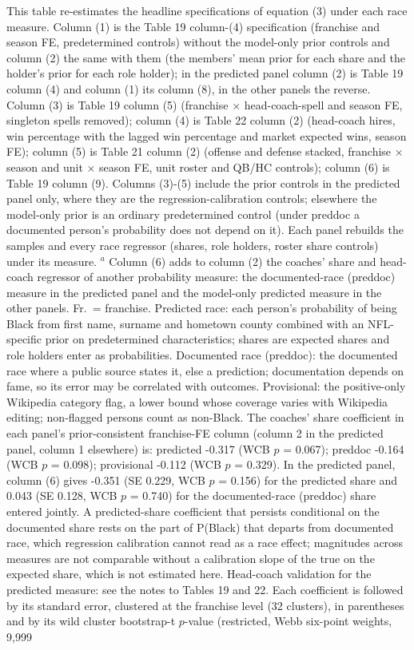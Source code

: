 \begin{table}[!h]
{\begin{threeparttable}
\begin{tablenotes}[para]
\item This table re-estimates the headline specifications of equation (3) under each race measure. Column (1) is the Table 19 column-(4) specification (franchise and season FE, predetermined controls) without the model-only prior controls and column (2) the same with them (the members' mean prior for each share and the holder's prior for each role holder); in the predicted panel column (2) is Table 19 column (4) and column (1) its column (8), in the other panels the reverse. Column (3) is Table 19 column (5) (franchise $\times$ head-coach-spell and season FE, singleton spells removed); column (4) is Table 22 column (2) (head-coach hires, win percentage with the lagged win percentage and market expected wins, season FE); column (5) is Table 21 column (2) (offense and defense stacked, franchise $\times$ season and unit $\times$ season FE, unit roster and QB/HC controls); column (6) is Table 19 column (9). Columns (3)-(5) include the prior controls in the predicted panel only, where they are the regression-calibration controls; elsewhere the model-only prior is an ordinary predetermined control (under preddoc a documented person's probability does not depend on it). Each panel rebuilds the samples and every race regressor (shares, role holders, roster share controls) under its measure. $^a$ Column (6) adds to column (2) the coaches' share and head-coach regressor of another probability measure: the documented-race (preddoc) measure in the predicted panel and the model-only predicted measure in the other panels. Fr.\ = franchise. Predicted race: each person's probability of being Black from first name, surname and hometown county combined with an NFL-specific prior on predetermined characteristics; shares are expected shares and role holders enter as probabilities. Documented race (preddoc): the documented race where a public source states it, else a prediction; documentation depends on fame, so its error may be correlated with outcomes. Provisional: the positive-only Wikipedia category flag, a lower bound whose coverage varies with Wikipedia editing; non-flagged persons count as non-Black. The coaches' share coefficient in each panel's prior-consistent franchise-FE column (column 2 in the predicted panel, column 1 elsewhere) is: predicted -0.317 (WCB $p$ = 0.067); preddoc -0.164 (WCB $p$ = 0.098); provisional -0.112 (WCB $p$ = 0.329). In the predicted panel, column (6) gives -0.351 (SE 0.229, WCB $p$ = 0.156) for the predicted share and 0.043 (SE 0.128, WCB $p$ = 0.740) for the documented-race (preddoc) share entered jointly. A predicted-share coefficient that persists conditional on the documented share rests on the part of P(Black) that departs from documented race, which regression calibration cannot read as a race effect; magnitudes across measures are not comparable without a calibration slope of the true on the expected share, which is not estimated here. Head-coach validation for the predicted measure: see the notes to Tables 19 and 22. Each coefficient is followed by its standard error, clustered at the franchise level (32 clusters), in parentheses and by its wild cluster bootstrap-t $p$-value (restricted, Webb six-point weights, 9,999 
\end{tablenotes}
\end{threeparttable}}
\end{table}
